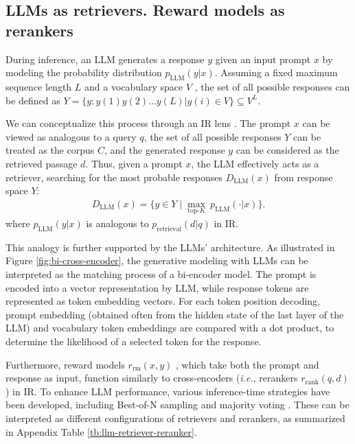 \subsection{LLMs as retrievers. Reward models as rerankers}
During inference, an LLM generates a response $y$ given an input prompt $x$ by modeling the probability distribution $p_{\text{LLM}}(y|x)$.
Assuming a fixed maximum sequence length $L$ and a vocabulary space $V$ \citep{li2024matching}, the set of all possible responses can be defined as  $Y=\{y:y(1)y(2)...y(L) | y(i) \in V\} \subseteq V^L$.

We can conceptualize this process through an IR lens \citep{tay2022transformer}. The prompt $x$ can be viewed as analogous to a query $q$, the set of all possible responses $Y$ can be treated as the corpus $C$, and the generated response $y$ can be considered as the retrieved passage $d$.
Thus, given a prompt $x$, the LLM effectively acts as a retriever, searching for the most probable responses $D_{\text{LLM}}(x)$ from response space $Y$:
\begin{gather}\label{eq:retriever2}
    D_{\text{LLM}}(x) = \{ y \in Y \;|\; \max_{\text{top-}K} ~ p_{\text{LLM}}(\cdot | x)\}.
\end{gather}
where $p_{\text{LLM}}(y|x)$ is analogous to $p_{\text{retrieval}}(d|q)$ in IR.

This analogy is further supported by the LLMs' architecture. 
As illustrated in Figure \ref{fig:bi-cross-encoder}, the generative modeling with LLMs can be interpreted as the matching process of a bi-encoder model. 
The prompt is encoded into a vector representation by LLM, while response tokens are represented as token embedding vectors. 
For each token position decoding, prompt embedding (obtained often from the hidden state of the last layer of the LLM) and vocabulary token embeddings are compared with a dot product, to determine the likelihood of a selected token for the response.

Furthermore, reward models $r_\text{rm}(x,y)$ \citep{lambert2024rewardbench}, which take both the prompt and response as input, function similarly to cross-encoders (\textit{i.e.}, rerankers $r_\text{rank}(q,d)$ \citep{zhuang2023rankt5}) in IR.
To enhance LLM performance, various inference-time strategies have been developed, including Best-of-N sampling \citep{stiennon2020learning} and majority voting \citep{wang2022self}.  
These can be interpreted as different configurations of retrievers and rerankers, as summarized in Appendix Table \ref{tb:llm-retriever-reranker}.



